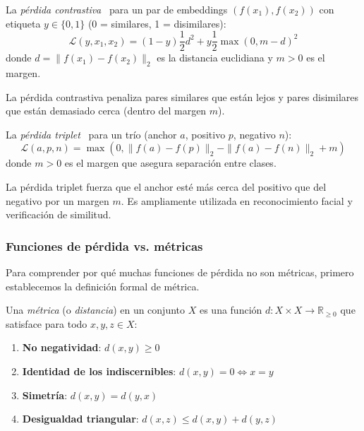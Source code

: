 \begin{definition}\label{def:contrastive_loss}
	La \textit{pérdida contrastiva}~\citep{hadsell2006dimensionality} para un par de embeddings \((f(x_1), f(x_2))\) con etiqueta \(y \in \{0, 1\}\) (0 = similares, 1 = disimilares):
	\[
		\mathcal{L}(y, x_1, x_2) = (1-y) \frac{1}{2} d^2 + y \frac{1}{2} \max(0, m - d)^2
	\]
	donde \(d = \|f(x_1) - f(x_2)\|_2\) es la distancia euclidiana y \(m > 0\) es el margen.
\end{definition}

La pérdida contrastiva penaliza pares similares que están lejos y pares disimilares que están demasiado cerca (dentro del margen \(m\)).

\begin{definition}\label{def:triplet_loss}
	La \textit{pérdida triplet}~\citep{schroff2015facenet} para un trío (anchor \(a\), positivo \(p\), negativo \(n\)):
	\[
		\mathcal{L}(a, p, n) = \max(0, \|f(a) - f(p)\|_2 - \|f(a) - f(n)\|_2 + m)
	\]
	donde \(m > 0\) es el margen que asegura separación entre clases.
\end{definition}

La pérdida triplet fuerza que el anchor esté más cerca del positivo que del negativo por un margen \(m\). Es ampliamente utilizada en reconocimiento facial y verificación de similitud.

\subsubsection{Funciones de pérdida vs. métricas}

Para comprender por qué muchas funciones de pérdida no son métricas, primero establecemos la definición formal de métrica.

\begin{definition}[Métrica]\label{def:metrica}
	Una \textit{métrica} (o \textit{distancia}) en un conjunto \(X\) es una función \(d: X \times X \to \mathbb{R}_{\geq 0}\) que satisface para todo \(x, y, z \in X\):
	\begin{enumerate}
		\item \textbf{No negatividad}: \(d(x, y) \geq 0\)
		\item \textbf{Identidad de los indiscernibles}: \(d(x, y) = 0 \iff x = y\)
		\item \textbf{Simetría}: \(d(x, y) = d(y, x)\)
		\item \textbf{Desigualdad triangular}: \(d(x, z) \leq d(x, y) + d(y, z)\)
	\end{enumerate}
\end{definition}

